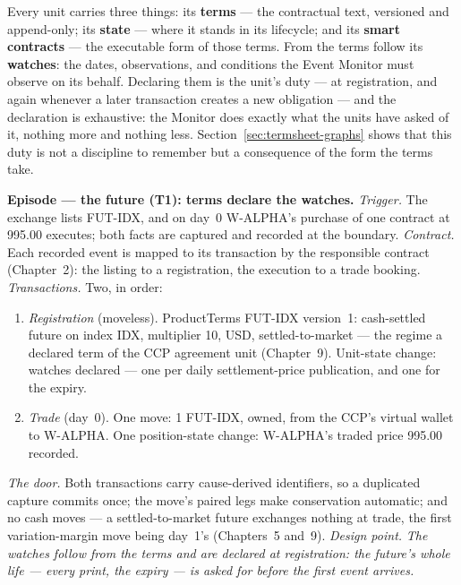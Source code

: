 \documentclass[11pt,a4paper]{article}
\begin{document}
Every unit carries three things: its \textbf{terms} --- the contractual text, versioned
and append-only; its \textbf{state} --- where it stands in its lifecycle; and its
\textbf{smart contracts} --- the executable form of those terms. From the terms follow
its \textbf{watches}: the dates, observations, and conditions the Event Monitor must
observe on its behalf. Declaring them is the unit's duty --- at registration, and again
whenever a later transaction creates a new obligation --- and the declaration is
exhaustive: the Monitor does exactly what the units have asked of it, nothing more and
nothing less. Section~\ref{sec:termsheet-graphs} shows that this duty is not a discipline
to remember but a consequence of the form the terms take.

\medskip\noindent\textbf{Episode --- the future (T1): terms declare the watches.}
\emph{Trigger.} The exchange lists FUT-IDX, and on day~0 W-ALPHA's purchase of one
contract at 995.00 executes; both facts are captured and recorded at the boundary.
\emph{Contract.} Each recorded event is mapped to its transaction by the responsible
contract (Chapter~2): the listing to a registration, the execution to a trade booking.
\emph{Transactions.} Two, in order:
\begin{enumerate}[nosep,leftmargin=2.2em]
\item \emph{Registration} (moveless). ProductTerms FUT-IDX version~1: cash-settled
  future on index IDX, multiplier 10, USD, settled-to-market --- the regime a declared
  term of the CCP agreement unit (Chapter~9). Unit-state change: watches declared ---
  one per daily settlement-price publication, and one for the expiry.
\item \emph{Trade} (day~0). One move: 1 FUT-IDX, owned, from the CCP's virtual wallet to
  W-ALPHA. One position-state change: W-ALPHA's traded price 995.00 recorded.
\end{enumerate}
\emph{The door.} Both transactions carry cause-derived identifiers, so a duplicated
capture commits once; the move's paired legs make conservation automatic; and no cash
moves --- a settled-to-market future exchanges nothing at trade, the first
variation-margin move being day~1's (Chapters~5 and~9).
\emph{Design point.} \emph{The watches follow from the terms and are declared at
registration: the future's whole life --- every print, the expiry --- is asked for
before the first event arrives.}
\end{document}
